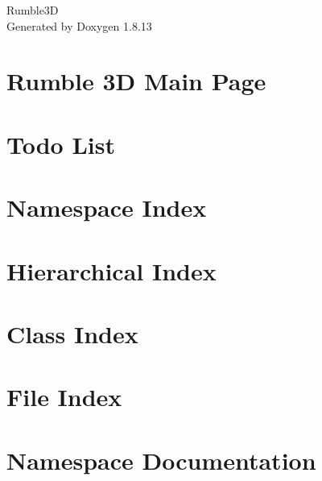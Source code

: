 \documentclass[twoside]{book}
\newcommand{\+}{\discretionary{\mbox{\scriptsize$\hookleftarrow$}}{}{}}
\newcommand{\clearemptydoublepage}{%
  \newpage{\pagestyle{empty}\cleardoublepage}%
}
\begin{document}
\hypersetup{pageanchor=false,
             bookmarksnumbered=true,
             pdfencoding=unicode
            }
\begin{titlepage}
\vspace*{7cm}
\begin{center}%
{\Large Rumble3D }\\
\vspace*{1cm}
{\large Generated by Doxygen 1.8.13}\\
\end{center}
\end{titlepage}
\clearemptydoublepage
{}
\tableofcontents
\clearemptydoublepage
{}
\hypersetup{pageanchor=true}

\chapter{Rumble 3D Main Page}
\label{index}\hypertarget{index}{}
\chapter{Todo List}
\label{todo}

\chapter{Namespace Index}

\chapter{Hierarchical Index}

\chapter{Class Index}

\chapter{File Index}

\chapter{Namespace Documentation}

\end{document}
